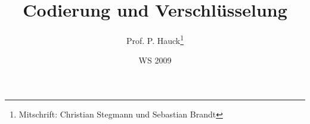 

\title{Codierung und Verschl\"usselung}
\author{Prof. P. Hauck\thanks{Mitschrift: Christian Stegmann und Sebastian Brandt}}
\date{WS 2009}



\maketitle

\tableofcontents

\newpage
\pagestyle{fancy}
\rhead{}

\newpage

